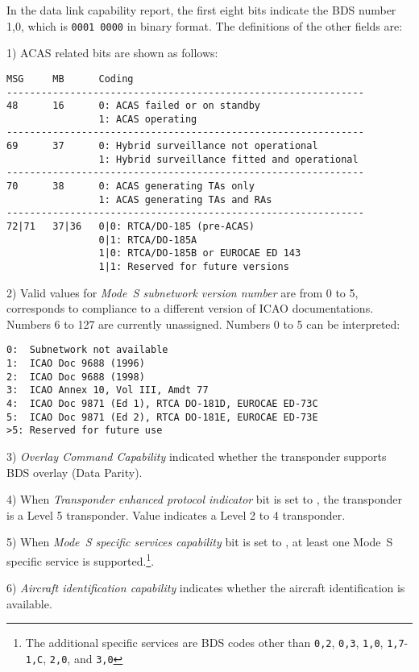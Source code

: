 In the data link capability report, the first eight bits indicate the BDS number 1,0, which is \texttt{0001 0000} in binary format. The definitions of the other fields are:

1) ACAS related bits are shown as follows:

\begin{verbatim}
MSG     MB      Coding
--------------------------------------------------------------
48      16      0: ACAS failed or on standby
                1: ACAS operating
--------------------------------------------------------------
69      37      0: Hybrid surveillance not operational
                1: Hybrid surveillance fitted and operational
--------------------------------------------------------------
70      38      0: ACAS generating TAs only
                1: ACAS generating TAs and RAs
--------------------------------------------------------------
72|71   37|36   0|0: RTCA/DO-185 (pre-ACAS)
                0|1: RTCA/DO-185A
                1|0: RTCA/DO-185B or EUROCAE ED 143
                1|1: Reserved for future versions
\end{verbatim}

2) Valid values for \emph{Mode~S subnetwork version number} are from 0 to 5, corresponds to compliance to a different version of ICAO documentations. Numbers 6 to 127 are currently unassigned. Numbers 0 to 5 can be interpreted:

\begin{verbatim}
0:  Subnetwork not available
1:  ICAO Doc 9688 (1996)
2:  ICAO Doc 9688 (1998)
3:  ICAO Annex 10, Vol III, Amdt 77
4:  ICAO Doc 9871 (Ed 1), RTCA DO-181D, EUROCAE ED-73C
5:  ICAO Doc 9871 (Ed 2), RTCA DO-181E, EUROCAE ED-73E
>5: Reserved for future use
\end{verbatim}

3) \emph{Overlay Command Capability} indicated whether the transponder supports BDS overlay (Data Parity).

4) When \emph{Transponder enhanced protocol indicator} bit is set to \1, the transponder is a Level 5 transponder. Value \0 indicates a Level 2 to 4 transponder.

5) When \emph{Mode~S specific services capability} bit is set to \1, at least one Mode~S specific service is supported.\footnote{The additional specific services are BDS codes other than \texttt{0,2}, \texttt{0,3}, \texttt{1,0}, \texttt{1,7}-\texttt{1,C}, \texttt{2,0}, and \texttt{3,0}}.

6) \emph{Aircraft identification capability} indicates whether the aircraft identification is available.

